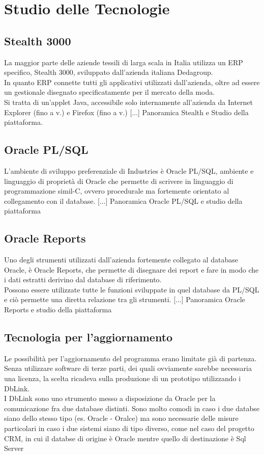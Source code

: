 \section{Studio delle Tecnologie}
\subsection{Stealth 3000}
La maggior parte delle aziende tessili di larga scala in Italia utilizza un ERP specifico, Stealth 3000, sviluppato dall'azienda italiana Dedagroup.\\
In quanto ERP connette tutti gli applicativi utilizzati dall'azienda, oltre ad essere un gestionale disegnato specificatamente per il mercato della moda. \\
Si tratta di un'applet Java, accessibile solo internamente all'azienda da Internet Explorer (fino a v.) e Firefox (fino a v.)%
[...] Panoramica Stealth e Studio della piattaforma.

\subsection{Oracle PL/SQL}
L'ambiente di sviluppo preferenziale di Industries è Oracle PL/SQL, ambiente e linguaggio di proprietà di Oracle che permette di scrivere in linguaggio di programmazione simil-C, ovvero procedurale ma fortemente orientato al collegamento con il database.
[...] Panoramica Oracle PL/SQL e studio della piattaforma

\subsection{Oracle Reports}
Uno degli strumenti utilizzati dall'azienda fortemente collegato al database Oracle, è Oracle Reports, che permette di disegnare dei report e fare in modo che i dati estratti derivino dal database di riferimento.\\
Possono essere utilizzate tutte le funzioni sviluppate in quel database da PL/SQL e ciò permette una diretta relazione tra gli strumenti.
[...] Panoramica Oracle Reports e studio della piattaforma

\subsection{Tecnologia per l'aggiornamento}
Le possibilità per l'aggiornamento del programma erano limitate già di partenza. Senza utilizzare software di terze parti, dei quali ovviamente sarebbe necessaria una licenza, la scelta ricadeva sulla produzione di un prototipo utilizzando i DbLink.\\
I DbLink sono uno strumento messo a disposizione da Oracle per la comunicazione fra due database distinti. Sono molto comodi in caso i due databse siano dello stesso tipo (es. Oracle - Oralce) ma sono necessarie delle misure particolari in caso i due sistemi siano di tipo diverso, come nel caso del progetto CRM, in cui il databse di origine è Oracle mentre quello di destinazione è Sql Server